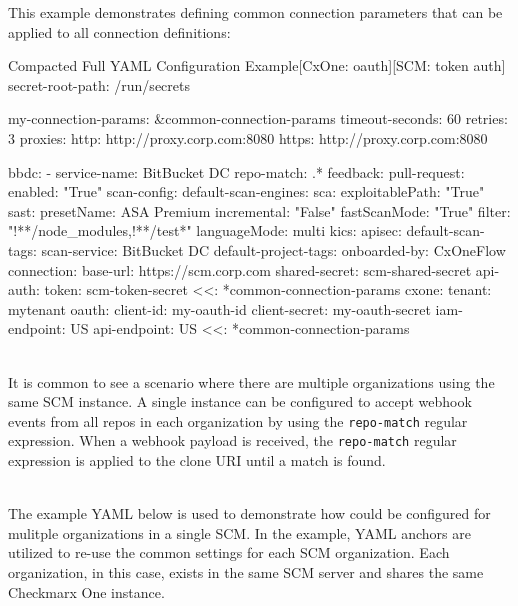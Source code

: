 This example demonstrates defining common connection parameters that can be applied
to all connection definitions:

\begin{code}{Compacted Full YAML Configuration Example}{[CxOne: oauth]}{[SCM: token auth]}
secret-root-path: /run/secrets

my-connection-params: &common-connection-params
    timeout-seconds: 60
    retries: 3
    proxies:
        http: http://proxy.corp.com:8080
        https: http://proxy.corp.com:8080


bbdc:
    - service-name: BitBucket DC
      repo-match: .*
      feedback:
        pull-request:
            enabled: "True"
      scan-config:
          default-scan-engines:
              sca:
                  exploitablePath: "True"
              sast:
                  presetName: ASA Premium
                  incremental: "False"
                  fastScanMode: "True"
                  filter: "!**/node_modules,!**/test*"
                  languageMode: multi
              kics:
              apisec:
          default-scan-tags:
              scan-service: BitBucket DC
          default-project-tags:
              onboarded-by: CxOneFlow
      connection:
          base-url: https://scm.corp.com
          shared-secret: scm-shared-secret
          api-auth:
              token: scm-token-secret
          <<: *common-connection-params
      cxone:
          tenant: mytenant
          oauth:
              client-id: my-oauth-id
              client-secret: my-oauth-secret
          iam-endpoint: US
          api-endpoint: US
          <<: *common-connection-params
\end{code}


\noindent\\It is common to see a scenario where there are multiple organizations
using the same SCM instance.  A single \cxoneflow instance can be configured to accept
webhook events from all repos in each organization by using the \texttt{repo-match}
regular expression.  When a webhook payload is received, the \texttt{repo-match}
regular expression is applied to the clone URI until a match is found.

\noindent\\The example YAML below is used to demonstrate how \cxoneflow could be configured
for mulitple organizations in a single SCM. In the example, YAML anchors are utilized to 
re-use the common settings for each SCM organization.  Each organization, in this case, 
exists in the same SCM server and shares the same Checkmarx One instance.

